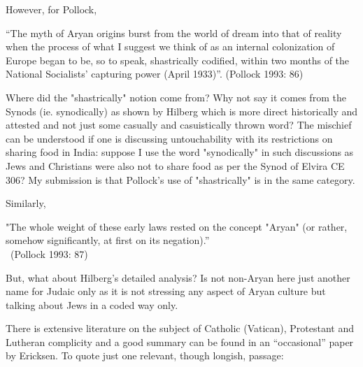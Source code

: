However, for Pollock, 
\begin{myquote}
“The myth of Aryan origins burst from the world of dream into that of reality when the process of what I suggest we think of as an internal colonization of Europe began to be, so to speak, shastrically codified, within two months of the National Socialists' capturing power (April 1933)”. 	\hfill (Pollock 1993: 86)
\end{myquote}

Where did the "shastrically" notion come from? Why not say it comes from the Synods (ie. synodically) as shown by Hilberg which is more direct historically and attested and not just some casually and casuistically thrown word? The mischief can be understood if one is discussing untouchability with its restrictions on sharing food in India: suppose I use the word "synodically" in such discussions as Jews and Christians were also not to share food as per the Synod of Elvira CE 306? My submission is that Pollock's use of "shastrically" is in the same category.

Similarly, 
\begin{myquote}
"The whole weight of these early laws rested on the concept "Aryan" (or rather, somehow significantly, at first on its negation).”\\[-15pt]

~\hfill(Pollock 1993: 87)
\end{myquote}

But, what about Hilberg's detailed analysis? Is not non-Aryan here just another name for Judaic only as it is not stressing any aspect of Aryan culture but talking about Jews in a coded way only.

There is extensive literature on the subject of Catholic (Vatican), Protestant and Lutheran complicity and a good summary can be found in an “occasional” paper by Ericksen. To quote just one relevant, though longish, passage:

